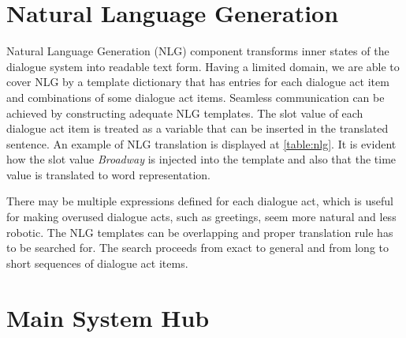 \section{Natural Language Generation}

Natural Language Generation (NLG) component transforms inner states of the dialogue system into readable text form.
Having a limited domain, we are able to cover NLG by a template dictionary that has entries for each dialogue act item and combinations of some dialogue act items.
Seamless communication can be achieved by constructing adequate NLG templates.
The slot value of each dialogue act item is treated as a variable that can be inserted in the translated sentence.
An example of NLG translation is displayed at \ref{table:nlg}.
It is evident how the slot value \textit{Broadway} is injected into the template and also that the time value is translated to word representation.

\begin{table}[h]
\centering
\small
\hspace*{-3pt}
\caption{Translation example of dialogue act to sentence by Natural Language Generation component}
\label{table:nlg}
\end{table}

There may be multiple expressions defined for each dialogue act, which is useful for making overused dialogue acts, such as greetings, seem more natural and less robotic.
The NLG templates can be overlapping and proper translation rule has to be searched for.
The search proceeds from exact to general and from long to short sequences of dialogue act items.

\section{Main System Hub}

